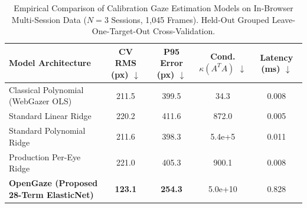 \begin{table}[t]
\centering
\caption{Empirical Comparison of Calibration Gaze Estimation Models on In-Browser Multi-Session Data ($N=3$ Sessions, 1,045 Frames). Held-Out Grouped Leave-One-Target-Out Cross-Validation.}
\label{tab:baseline_comparison}
\begin{tabular}{lcccc}
\toprule
\textbf{Model Architecture} & \textbf{CV RMS (px)} $\downarrow$ & \textbf{P95 Error (px)} $\downarrow$ & \textbf{Cond. $\kappa(A^T A)$} $\downarrow$ & \textbf{Latency (ms)} $\downarrow$ \\
\midrule
Classical Polynomial (WebGazer OLS) & 211.5 & 399.5 & 34.3 & 0.008 \\
Standard Linear Ridge & 220.2 & 411.6 & 872.0 & 0.005 \\
Standard Polynomial Ridge & 211.6 & 398.3 & 5.4e+5 & 0.011 \\
Production Per-Eye Ridge & 221.0 & 405.3 & 900.1 & 0.008 \\
\textbf{OpenGaze (Proposed 28-Term ElasticNet)} & \textbf{123.1} & \textbf{254.3} & 5.0e+10 & 0.828 \\
\bottomrule
\end{tabular}
\end{table}
